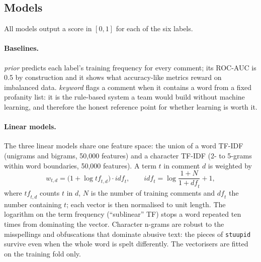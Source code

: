 \documentclass[11pt,a4paper]{article}
\begin{document}
\subsection{Models}

All models output a score in $[0,1]$ for each of the six labels.

\paragraph{Baselines.}
\emph{prior} predicts each label's training frequency for every comment; its
ROC-AUC is 0.5 by construction and it shows what accuracy-like metrics reward
on imbalanced data.  \emph{keyword} flags a comment when it contains a word
from a fixed profanity list: it is the rule-based system a team would build
without machine learning, and therefore the honest reference point for whether
learning is worth it.

\paragraph{Linear models.}
The three linear models share one feature space: the union of a word TF-IDF
(unigrams and bigrams, 50,000 features) and a character TF-IDF (2- to 5-grams
within word boundaries, 50,000 features).  A term $t$ in comment $d$ is
weighted by
\begin{equation}
  w_{t,d} = \bigl(1 + \log \mathit{tf}_{t,d}\bigr) \cdot \mathit{idf}_t,
  \qquad
  \mathit{idf}_t = \log\frac{1 + N}{1 + \mathit{df}_t} + 1,
\end{equation}
where $\mathit{tf}_{t,d}$ counts $t$ in $d$, $N$ is the number of training
comments and $\mathit{df}_t$ the number containing $t$; each vector is then
normalised to unit length.  The logarithm on the term frequency (``sublinear''
TF) stops a word repeated ten times from dominating the vector.  Character
n-grams are robust to the misspellings and obfuscations that dominate abusive
text: the pieces of \texttt{stuupid} survive even when the whole word is
spelt differently.  The vectorisers are fitted on the training fold only.
\end{document}
